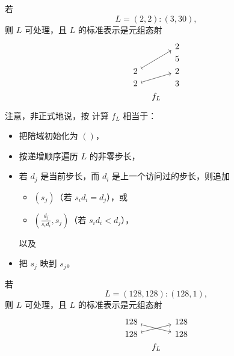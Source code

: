 \begin{example}
    若
    \[L = (2,2):(3,30),\]
    则 $L$ 可处理，且 $L$ 的标准表示是元组态射
    \[ \begin{tikzcd} [row sep = 1, column sep = 8]
     & & 2\\
     & & 5\\
    2 \ar[uurr,mapsto] & & 2 \\
    2 \ar[urr,mapsto] & & 3 \\
    & f_L & \\
    \end{tikzcd} \]
注意，非正式地说，按  计算 $f_L$ 相当于：
\begin{itemize}
    \item 把陪域初始化为 $ ()$，
    \item 按递增顺序遍历 $L$ 的非零步长，
    \item 若 $d_j$ 是当前步长，而 $d_i$ 是上一个访问过的步长，则追加
    \begin{itemize}
    \item $(s_j)$（若 $s_{i}d_{i} = d_j$），或
    \item $\left(\frac{d_j}{s_id_i},s_j\right)$（若 $s_id_i < d_j$），
    \end{itemize}
    以及
    \item 把 $s_j$ 映到 $s_j$。
\end{itemize}
\end{example}

\begin{example}
    若
    \[L = (128,128):(128,1),\]
    则 $L$ 可处理，且 $L$ 的标准表示是元组态射
\[
\begin{tikzcd}[row sep = 1, column sep = 8]
128 \ar[drr,mapsto] & & 128 \\
128 \ar[urr,mapsto] & & 128 \\
& f_L &
\end{tikzcd}
\]
\end{example}

